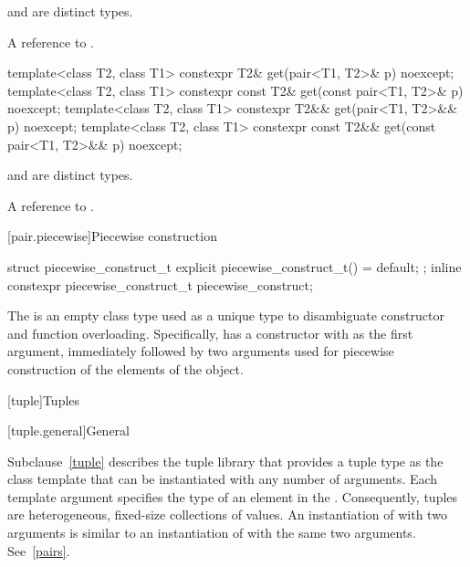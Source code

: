 \begin{itemdescr}
\pnum
\mandates
{} and  are distinct types.

\pnum
\returns
A reference to .
\end{itemdescr}

%
\begin{itemdecl}
template<class T2, class T1>
  constexpr T2& get(pair<T1, T2>& p) noexcept;
template<class T2, class T1>
  constexpr const T2& get(const pair<T1, T2>& p) noexcept;
template<class T2, class T1>
  constexpr T2&& get(pair<T1, T2>&& p) noexcept;
template<class T2, class T1>
  constexpr const T2&& get(const pair<T1, T2>&& p) noexcept;
\end{itemdecl}

\begin{itemdescr}
\pnum
\mandates
{} and  are distinct types.

\pnum
\returns
A reference to .
\end{itemdescr}

[pair.piecewise]{Piecewise construction}

%
%
\begin{itemdecl}
struct piecewise_construct_t {
  explicit piecewise_construct_t() = default;
};
inline constexpr piecewise_construct_t piecewise_construct{};
\end{itemdecl}

\pnum
The   is an empty class type
used as a unique type to disambiguate constructor and function overloading. Specifically,
 has a constructor with  as the
first argument, immediately followed by two  arguments used
for piecewise construction of the elements of the  object.

[tuple]{Tuples}

[tuple.general]{General}

\pnum
{}%
Subclause~\ref{tuple} describes the tuple library that provides a tuple type as
the class template  that can be instantiated with any number
of arguments. Each template argument specifies
the type of an element in the .  Consequently, tuples are
heterogeneous, fixed-size collections of values. An instantiation of  with
two arguments is similar to an instantiation of  with the same two arguments.
See~\ref{pairs}.

